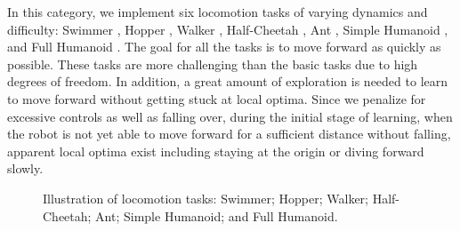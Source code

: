 \documentclass{article}
\begin{document}
In this category, we implement six locomotion tasks of varying dynamics and difficulty: Swimmer \cite{PurcellSwimmer, coulom2002reinforcement, levine2013guided, Schulman15TRPO}, Hopper \cite{murthy19843d, erez2011infinite, levine2013guided, Schulman15TRPO}, Walker \cite{raibert1991animation, erez2011infinite, levine2013guided, Schulman15TRPO}, Half-Cheetah \cite{wawrzynski2007learning, Heess15}, Ant \cite{Schulman15GAE}, Simple Humanoid \cite{tassa2012synthesis, Schulman15GAE}, and Full Humanoid \cite{tassa2012synthesis}.
The goal for all the tasks is to move forward as quickly as possible. These tasks are more challenging than the basic tasks due to high degrees of freedom. In addition, a great amount of exploration is needed to learn to move forward without getting stuck at local optima. Since we penalize for excessive controls as well as falling over, during the initial stage of learning, when the robot is not yet able to move forward for a sufficient distance without falling, apparent local optima exist including staying at the origin or diving forward slowly.



\begin{figure}[!h]
\caption{Illustration of locomotion tasks:  Swimmer;  Hopper;  Walker;  Half-Cheetah;  Ant;  Simple Humanoid; and  Full Humanoid.}\label{fig:plots_locomotion_tasks}
\end{figure}
\end{document}
